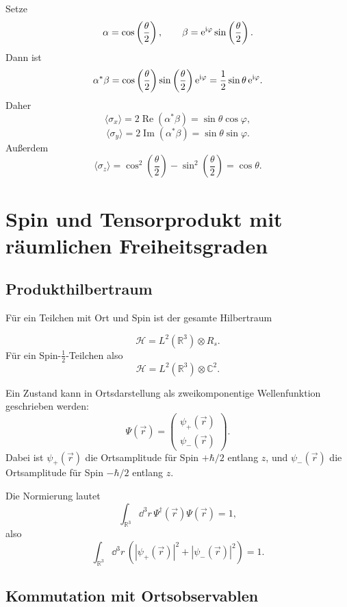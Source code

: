 \begin{derivationbox}
Setze
\[
    \alpha=\cos\left(\frac{\theta}{2}\right),
    \qquad
    \beta=\mathrm{e}^{\mathrm{i}\varphi}\sin\left(\frac{\theta}{2}\right).
\]
Dann ist
\[
    \alpha^*\beta
    =\cos\left(\frac{\theta}{2}\right)
    \sin\left(\frac{\theta}{2}\right)\mathrm{e}^{\mathrm{i}\varphi}
    =\frac12\sin\theta\,\mathrm{e}^{\mathrm{i}\varphi}.
\]
Daher
\[
    \langle\sigma_x\rangle
    =2\operatorname{Re}(\alpha^*\beta)
    =\sin\theta\cos\varphi,
\]
\[
    \langle\sigma_y\rangle
    =2\operatorname{Im}(\alpha^*\beta)
    =\sin\theta\sin\varphi.
\]
Außerdem
\[
    \langle\sigma_z\rangle
    =\cos^2\left(\frac{\theta}{2}\right)
    -\sin^2\left(\frac{\theta}{2}\right)
    =\cos\theta.
\]
\end{derivationbox}

\section{Spin und Tensorprodukt mit räumlichen Freiheitsgraden}

\subsection{Produkthilbertraum}

Für ein Teilchen mit Ort und Spin ist der gesamte Hilbertraum
\begin{definitionbox}
\[
    \mathcal H = L^2(\mathbb R^3)\otimes R_s.
\]
Für ein Spin-\(\frac12\)-Teilchen also
\[
    \mathcal H = L^2(\mathbb R^3)\otimes\mathbb C^2.
\]
\end{definitionbox}

Ein Zustand kann in Ortsdarstellung als zweikomponentige Wellenfunktion geschrieben werden:
\[
    \Psi(\vec r)=
    \begin{pmatrix}
        \psi_+(\vec r)\\
        \psi_-(\vec r)
    \end{pmatrix}.
\]
Dabei ist \(\psi_+(\vec r)\) die Ortsamplitude für Spin \(+\hbar/2\) entlang \(z\), und \(\psi_-(\vec r)\) die Ortsamplitude für Spin \(-\hbar/2\) entlang \(z\).

Die Normierung lautet
\[
    \int_{\mathbb R^3}\dd^3r\,
    \Psi^\dagger(\vec r)\Psi(\vec r)=1,
\]
also
\[
    \int_{\mathbb R^3}\dd^3r\,
    \left(|\psi_+(\vec r)|^2+|\psi_-(\vec r)|^2\right)=1.
\]

\subsection{Kommutation mit Ortsobservablen}


